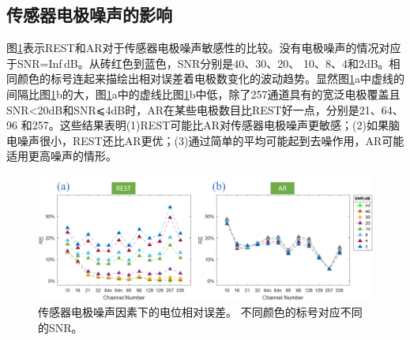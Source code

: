\subsection{传感器电极噪声的影响}
图\ref{2.8}表示REST和AR对于传感器电极噪声敏感性的比较。没有电极噪声的情况对应于SNR=Inf$\,$dB。从砖红色到蓝色，SNR分别是40、30、20、
10、8、4和2dB。相同颜色的标号连起来描绘出相对误差着电极数变化的波动趋势。显然图\ref{2.8}a中虚线的间隔比图\ref{2.8}b的大，图\ref{2.8}a中的虚线比图\ref{2.8}b中低，除了257通道具有的宽泛电极覆盖且SNR<20dB和SNR⩽4dB时，AR在某些电极数目比REST好一点，分别是21、64、96
和257。这些结果表明(1)REST可能比AR对传感器电极噪声更敏感；(2)如果脑电噪声很小，REST还比AR更优；(3)通过简单的平均可能起到去噪作用，AR可能适用更高噪声的情形。
\begin{figure}[h!]
	\centering
	\includegraphics[width=15cm]{pic/JNE/figure8.png}
	\caption{传感器电极噪声因素下的电位相对误差。 不同颜色的标号对应不同的SNR。}
	\label{2.8}
\end{figure}
